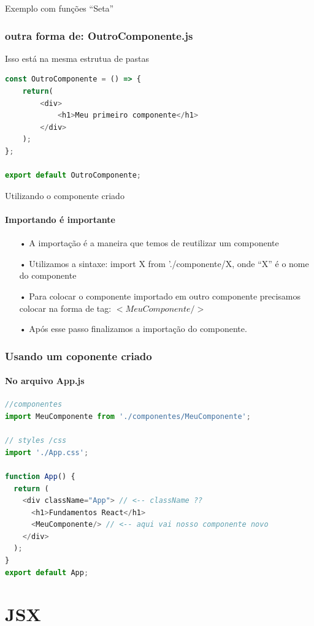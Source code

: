 \documentclass[13pt, xcolor={dvipsnames,svgnames}, portuguese]{beamer}
\begin{document}
\begin{frame}[fragile]{Exemplo com funções ``Seta''}
\frametitle{outra forma de: OutroComponente.js}
Isso está na mesma estrutua de pastas
\begin{lstlisting}[language=JavaScript]
const OutroComponente = () => {
    return(
        <div>
            <h1>Meu primeiro componente</h1>
        </div>
    );
};

export default OutroComponente;
\end{lstlisting}
\end{frame}




\begin{frame}{Utilizando o componente criado}
\framesubtitle{Importando é importante}
\begin{itemize}
	\item[•] A importação é a maneira que temos de reutilizar um componente
	\pause
	\item[•] Utilizamos a sintaxe: import X from './componente/X, onde ``X'' é o nome do componente
	\pause
	\item[•] Para colocar o componente importado em outro componente precisamos colocar na forma de tag: $<MeuComponente/>$
	\pause
	\item[•] Após esse passo finalizamos a importação do componente.

\end{itemize}
\end{frame}



\begin{frame}[fragile]
\frametitle{Usando um coponente criado}
\framesubtitle{No arquivo App.js}
\begin{lstlisting}[language=JavaScript]
//componentes
import MeuComponente from './componentes/MeuComponente';

// styles /css
import './App.css';

function App() {
  return (
    <div className="App"> // <-- className ??
      <h1>Fundamentos React</h1>
      <MeuComponente/> // <-- aqui vai nosso componente novo
    </div>
  );
}
export default App;
\end{lstlisting}
\end{frame}

\section{JSX}
\end{document}
